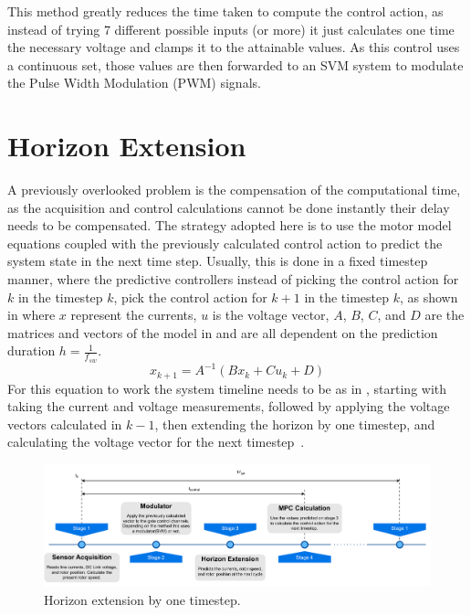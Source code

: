 \documentclass[9pt,conference]{IEEEtran}
\begin{document}
This method greatly reduces the time taken to compute the control action, as instead of trying 7 different possible inputs (or more) it just calculates one time the necessary voltage and clamps it to the attainable values. As this control uses a continuous set, those values are then forwarded to an SVM system to modulate the Pulse Width Modulation (PWM) signals.

\section {Horizon Extension}

A previously overlooked problem is the compensation of the computational time, as the acquisition and control calculations cannot be done instantly their delay needs to be compensated. The strategy adopted here is to use the motor model equations  coupled with the previously calculated control action to predict the system state in the next time step. Usually, this is done in a fixed timestep manner, where the predictive controllers instead of picking the control action for $k$ in the timestep $k$, pick the control action for $k+1$ in the timestep $k$, as shown in  where $x$ represent the currents, $u$ is the voltage vector, $A$, $B$, $C$, and $D$ are the matrices and vectors of the model in  and are all dependent on the prediction duration $h = \frac{1}{f_{sw}}$.
\begin{equation}
	x_{k+1} = A^{-1} \left (B x_k + C u_k + D\right )
	\label{eq:horizon_default}
\end{equation}
For this equation to work the system timeline needs to be as in , starting with taking the current and voltage measurements, followed by applying the voltage vectors calculated in $k-1$, then extending the horizon by one timestep, and calculating the voltage vector for the next timestep~\cite{Vazquez:MPC_uses:2014}.

\begin{figure}[!htb]
	\centering
	\includegraphics[width=.8\linewidth]{Figures/Horizon Extension default Timeline.pdf}
	\caption[Horizon extension by one timestep.]{Horizon extension by one timestep.}
	\label{fig:horizon_default_timeline} %
\end{figure}
\end{document}
